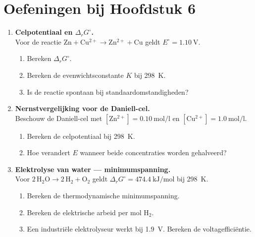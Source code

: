 
\section*{Oefeningen bij Hoofdstuk 6}

\begin{enumerate}

\item \textbf{Celpotentiaal en $\Delta_r G^\circ$.} \\
Voor de reactie $\mathrm{Zn + Cu^{2+} \rightarrow Zn^{2+} + Cu}$ geldt $E^\circ = \SI{1.10}{\volt}$.
\begin{enumerate}
\item[(a)] Bereken $\Delta_r G^\circ$.
\item[(b)] Bereken de evenwichtsconstante $K$ bij \SI{298}{\kelvin}.
\item[(c)] Is de reactie spontaan bij standaardomstandigheden?
\end{enumerate}

\item \textbf{Nernstvergelijking voor de Daniell-cel.} \\
Beschouw de Daniell-cel met $[\mathrm{Zn^{2+}}] = \SI{0.10}{\mole\per\litre}$ en $[\mathrm{Cu^{2+}}] = \SI{1.0}{\mole\per\litre}$.
\begin{enumerate}
\item[(a)] Bereken de celpotentiaal bij \SI{298}{\kelvin}.
\item[(b)] Hoe verandert $E$ wanneer beide concentraties worden gehalveerd?
\end{enumerate}

\item \textbf{Elektrolyse van water --- minimumspanning.} \\
Voor $\mathrm{2\,H_2O \rightarrow 2\,H_2 + O_2}$ geldt $\Delta_r G^\circ = \SI{+474.4}{\kilo\joule\per\mole}$ bij \SI{298}{\kelvin}.
\begin{enumerate}
\item[(a)] Bereken de thermodynamische minimumspanning.
\item[(b)] Bereken de elektrische arbeid per mol $\mathrm{H_2}$.
\item[(c)] Een industri\"ele elektrolyseur werkt bij \SI{1.9}{\volt}. Bereken de voltageffici\"entie.
\end{enumerate}


\end{enumerate}
